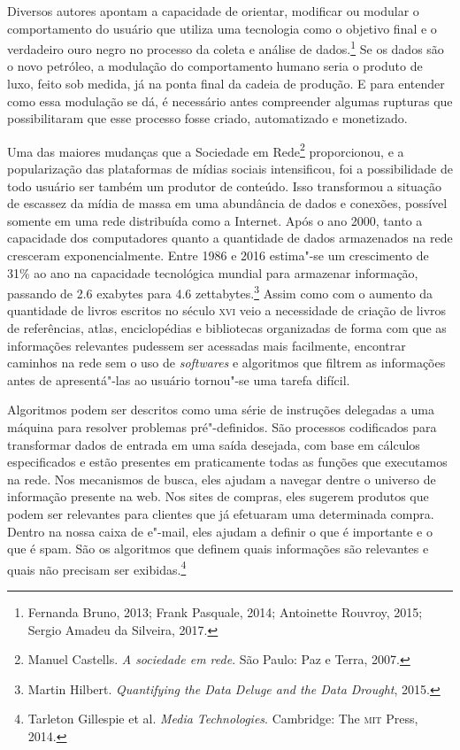 Diversos autores apontam a capacidade de orientar, modificar ou modular
o comportamento do usuário que utiliza uma tecnologia como o objetivo
final e o verdadeiro ouro negro no processo da coleta e análise de dados.\footnote{Fernanda Bruno, 2013; Frank Pasquale, 2014; Antoinette Rouvroy, 2015; Sergio Amadeu da Silveira, 2017.} Se os dados são o novo petróleo, a modulação do comportamento humano seria o
produto de luxo, feito sob medida, já na ponta final da cadeia de
produção. E para entender como essa modulação se dá, é necessário antes
compreender algumas rupturas que possibilitaram que esse processo fosse
criado, automatizado e monetizado.

Uma das maiores mudanças que a Sociedade em Rede\footnote{Manuel Castells. \emph{A sociedade em rede}. São Paulo: Paz e Terra, 2007.}
proporcionou, e a popularização das plataformas de mídias sociais
intensificou, foi a possibilidade de todo usuário ser também um produtor
de conteúdo. Isso transformou a situação de escassez da mídia de massa
em uma abundância de dados e conexões, possível somente em uma rede
distribuída como a Internet. Após o ano 2000, tanto a capacidade dos
computadores quanto a quantidade de dados armazenados na rede
cresceram exponencialmente. Entre 1986 e 2016 estima"-se um crescimento de
31\% ao ano na capacidade tecnológica mundial para armazenar informação,
passando de 2.6 exabytes para 4.6 zettabytes.\footnote{Martin Hilbert. \emph{Quantifying the Data Deluge and the Data Drought}, 2015.} Assim como
com o aumento da quantidade de livros escritos no século \textsc{xvi} veio a
necessidade de criação de livros de referências, atlas, enciclopédias e
bibliotecas organizadas de forma com que as informações relevantes
pudessem ser acessadas mais facilmente, encontrar caminhos na rede sem o
uso de \emph{softwares} e algoritmos que filtrem as informações antes de
apresentá"-las ao usuário tornou"-se uma tarefa difícil.


Algoritmos podem ser descritos como uma série de instruções delegadas a
uma máquina para resolver problemas pré"-definidos. São processos
codificados para transformar dados de entrada em uma saída desejada, com
base em cálculos especificados e estão presentes em praticamente todas
as funções que executamos na rede. Nos mecanismos de busca, eles ajudam
a navegar dentre o universo de informação presente na web. Nos sites de
compras, eles sugerem produtos que podem ser relevantes para clientes
que já efetuaram uma determinada compra. Dentro na nossa caixa de
e"-mail, eles ajudam a definir o que é importante e o que é spam. São os
algoritmos que definem quais informações são relevantes e quais não
precisam ser exibidas.\footnote{Tarleton Gillespie et al. \emph{Media
Technologies}. Cambridge: The \textsc{mit} Press, 2014.}

